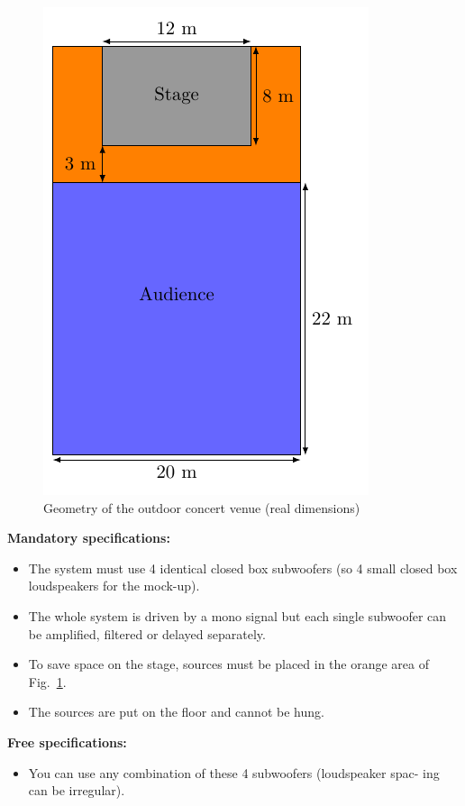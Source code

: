\documentclass[a4paper, 12pt]{article}
\begin{document}
\begin{figure}[!h]
	\centering
	\includegraphics{FIG_2.pdf}
	\caption{\label{fig2}Geometry of the outdoor concert venue (real dimensions)}
\end{figure}

\textbf{Mandatory specifications:}
\begin{itemize}
	\item The system must use 4 identical closed box subwoofers (so 4 small closed box loudspeakers for the mock-up).
	\item The whole system is driven by a mono signal but each single subwoofer can be amplified, filtered or delayed separately.
	\item To save space on the stage, sources must be placed in the orange area of Fig.~\ref{fig2}.
	\item The sources are put on the floor and cannot be hung.
\end{itemize}

\textbf{Free specifications:}
\begin{itemize}
	\item You can use any combination of these 4 subwoofers (loudspeaker spac- ing can be irregular).
\end{itemize}
\end{document}
